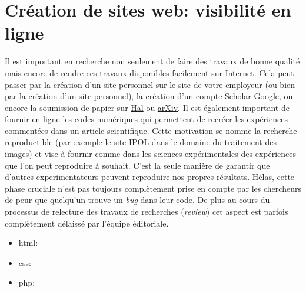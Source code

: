 \section{Création de sites web: visibilité en ligne}
Il est important en recherche non seulement de faire des travaux de bonne qualité
mais encore de rendre ces travaux disponibles facilement sur Internet. Cela peut passer par la création
d'un site personnel sur le site de votre employeur (ou bien par la création d'un site personnel),
la création d'un compte \href{http://scholar.google.com}{Scholar Google}, ou encore la soumission de papier
sur \href{http://hal.archives-ouvertes.fr/}{Hal} ou \href{http://arxiv.org/}{arXiv}.
Il est également important de fournir en ligne les codes numériques qui permettent de recréer les 
expériences commentées dans un article scientifique. Cette motivation se nomme 
la recherche reproductible (\lcf par exemple le site \href{http://www.ipol.im/}{IPOL} dans le domaine
du traitement des images)  et vise à fournir comme dans les sciences expérimentales des expériences 
que l'on peut reproduire à souhait. C'est la seule manière de garantir que d'autres experimentateurs
peuvent reproduire nos propres résultats. Hélas, cette phase cruciale n'est pas toujours complètement 
prise en compte par les chercheurs de peur que quelqu'un trouve un \textit{bug} dans leur code.
De plus au cours du processus de relecture des travaux de recherches (\textit{review}) cet
aspect est parfois complètement délaissé par l'équipe éditoriale.

\begin{itemize}
 \item  html:
 \item  css:
 \item  php:
\end{itemize}


